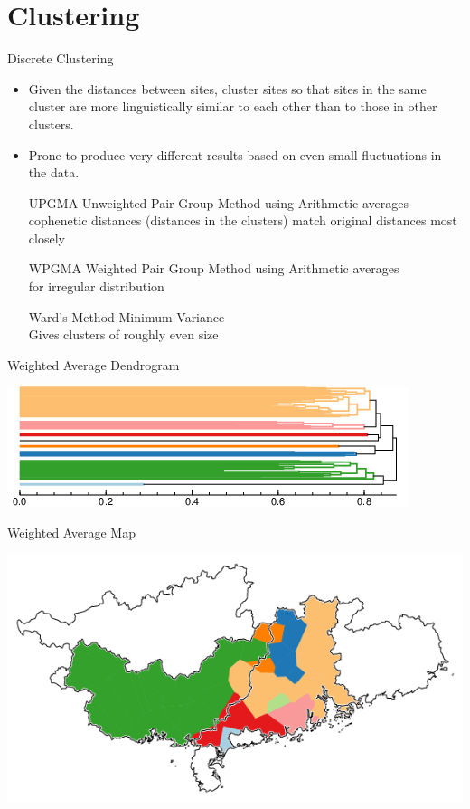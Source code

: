 \documentclass[presentation]{beamer}
\begin{document}
\section{Clustering}
\label{sec:orgdb9d449}
\begin{frame}[label={sec:org18d386d}]{Discrete Clustering}
\begin{itemize}
\item Given the distances between sites, cluster sites so that sites in the same cluster are more linguistically similar to each other than to those in other clusters.
\item Prone to produce very different results based on even small fluctuations in the data.
\item[{UPGMA}] Unweighted Pair Group Method using Arithmetic averages \\
cophenetic distances (distances in the clusters) match original distances most closely
\item[{WPGMA}] Weighted Pair Group Method using Arithmetic averages \\
for irregular distribution
\item[{Ward's Method}] Minimum Variance \\
Gives clusters of roughly even size
\end{itemize}
\end{frame}
\begin{frame}[label={sec:orge511255}]{Weighted Average Dendrogram}
\begin{center}
\includegraphics[width=.9\linewidth]{denwa8col.png}
\end{center}
\end{frame}
\begin{frame}[label={sec:org0674f8b}]{Weighted Average Map}
\begin{center}
\includegraphics[width=.9\linewidth]{mapwa8col.png}
\end{center}
\end{frame}
\end{document}
